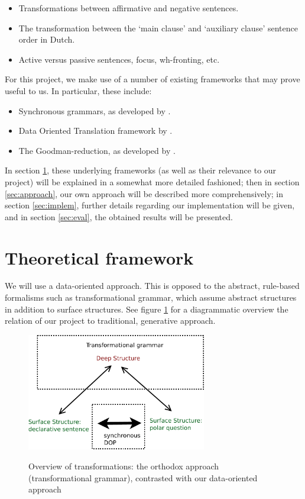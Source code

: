 \documentclass[a4paper]{article}
\theoremstyle{definition}
\begin{document}
\begin{itemize}
\item Transformations between affirmative and negative sentences.
\item The transformation between the `main clause' and `auxiliary clause'
	sentence order in Dutch.
\item Active versus passive sentences, focus, wh-fronting, etc.
\end{itemize}

For this project, we make use of a number of existing frameworks that may prove
useful to us. In particular, these include:

\begin{itemize}
\item Synchronous grammars, as developed by \citet{chiang2006introduction}.
\item Data Oriented Translation framework by \citet{poutsma2000msc, poutsma2000coling}.
\item The Goodman-reduction, as developed by \citet{goodman2003efficient}.
\end{itemize}

In section \ref{sec:theor}, these underlying frameworks (as well as their
relevance to our project) will be explained in a somewhat more detailed
fashioned; then in section \ref{sec:approach}, our own approach will be
described more comprehensively; in section \ref{sec:implem}, further details
regarding our implementation will be given, and in section \ref{sec:eval}, the
obtained results will be presented.

\section{Theoretical framework}
\label{sec:theor}

We will use a data-oriented approach. This is opposed to the abstract, rule-based
formalisms such as transformational grammar, which assume abstract structures in
addition to surface structures. See figure \ref{synchdop} for a diagrammatic overview
the relation of our project to traditional, generative approach.

\begin{figure}
\centering\includegraphics[width=0.7\textwidth]{synchdop-crop}
\label{synchdop}
\caption{Overview of transformations: the orthodox approach (transformational grammar),
	contrasted with our data-oriented approach}
\end{figure}
\end{document}
